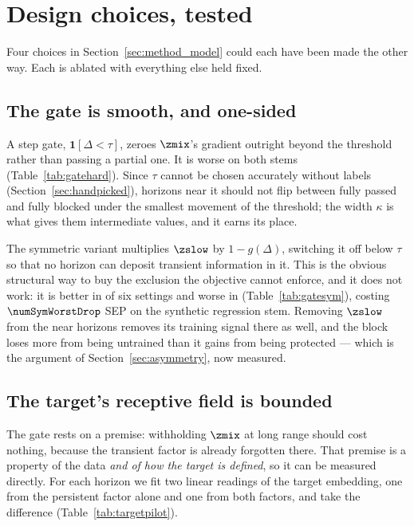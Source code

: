 \appendix

\section{Design choices, tested}
\label{app:design}

Four choices in Section~\ref{sec:method_model} could each have been made the other way. Each is ablated with everything else held fixed.

\subsection{The gate is smooth, and one-sided}

A step gate, $\mathbf{1}[\Delta<\tau]$, zeroes $\zmix$'s gradient outright beyond the threshold rather than passing a partial one. It is worse on both stems (Table~\ref{tab:gatehard}). Since $\tau$ cannot be chosen accurately without labels (Section~\ref{sec:handpicked}), horizons near it should not flip between fully passed and fully blocked under the smallest movement of the threshold; the width $\kappa$ is what gives them intermediate values, and it earns its place.



The symmetric variant multiplies $\zslow$ by $1-g(\Delta)$, switching it off below $\tau$ so that no horizon can deposit transient information in it. This is the obvious structural way to buy the exclusion the objective cannot enforce, and it does not work: it is better in \numSymBetter{} of six settings and worse in \numSymWorse{} (Table~\ref{tab:gatesym}), costing $\numSymWorstDrop$ SEP on the synthetic regression stem. Removing $\zslow$ from the near horizons removes its training signal there as well, and the block loses more from being untrained than it gains from being protected --- which is the argument of Section~\ref{sec:asymmetry}, now measured.



\subsection{The target's receptive field is bounded}

The gate rests on a premise: withholding $\zmix$ at long range should cost nothing, because the transient factor is already forgotten there. That premise is a property of the data \emph{and of how the target is defined}, so it can be measured directly. For each horizon we fit two linear readings of the target embedding, one from the persistent factor alone and one from both factors, and take the difference (Table~\ref{tab:targetpilot}).

